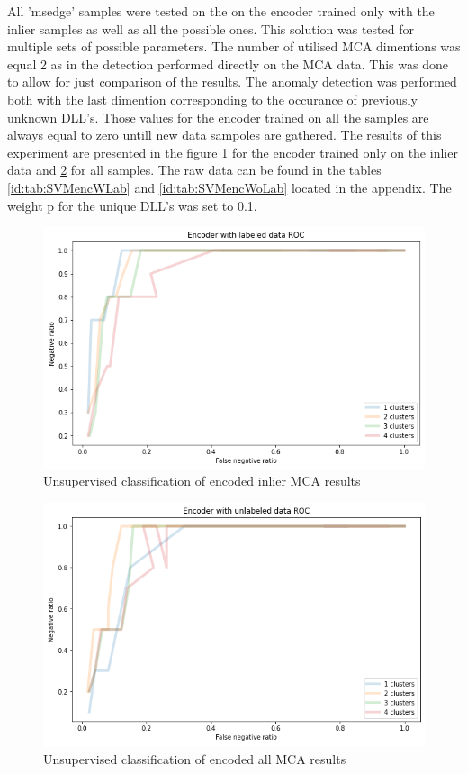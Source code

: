 \documentclass[a4paper,twoside,12pt]{book}
\begin{document}
All 'msedge' samples were tested on the on the encoder trained only with the inlier samples as well
as all the possible ones.
This solution was tested for multiple sets of possible parameters. The number of utilised MCA 
dimentions was equal 2 as in the detection performed directly on the MCA data. This was done to 
allow for just comparison of the results. The anomaly detection was performed
both with the last dimention corresponding to the occurance of previously unknown DLL's. Those
values for the encoder trained on all the samples are always equal to zero untill new data sampoles
are gathered.
The results of this experiment are presented in the figure \ref{fig:EncROCwLab} for 
the encoder trained only on the inlier data and \ref{fig:EncROCwoLab} for all samples. The raw data
can be found in the tables \ref{id:tab:SVMencWLab} and \ref{id:tab:SVMencWoLab} located in the 
appendix. The weight p for the unique DLL's was set to 0.1.

\begin{figure}
	\centering
	\includegraphics[scale=0.9]{images/EncROCwLabKF.PNG}
	\caption{Unsupervised classification of encoded inlier MCA results}
	\label{fig:EncROCwLab}
 \end{figure}

 \begin{figure}
	\centering
	\includegraphics[scale=0.9]{images/EncROCwoLabKF.PNG}
	\caption{Unsupervised classification of encoded all MCA results}
	\label{fig:EncROCwoLab}
 \end{figure}
\end{document}
